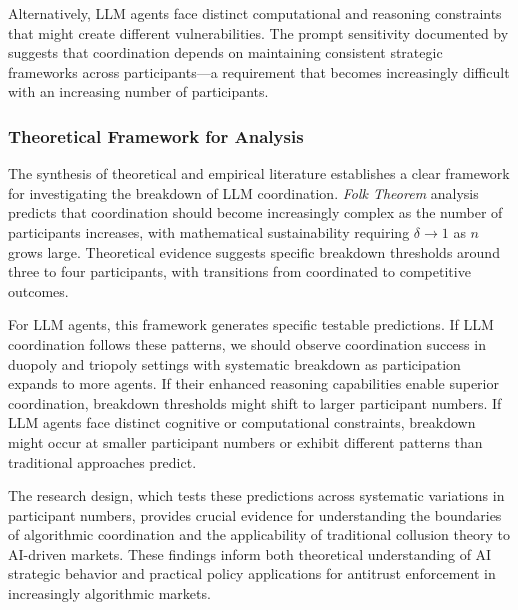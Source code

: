 
Alternatively, LLM agents face distinct computational and reasoning constraints that might create different vulnerabilities. The prompt sensitivity documented by \textcite{fish_algorithmic_2025} suggests that coordination depends on maintaining consistent strategic frameworks across participants---a requirement that becomes increasingly difficult with an increasing number of participants.

\subsubsection*{Theoretical Framework for Analysis}

The synthesis of theoretical and empirical literature establishes a clear framework for investigating the breakdown of LLM coordination. \emph{Folk Theorem} analysis predicts that coordination should become increasingly complex as the number of participants increases, with mathematical sustainability requiring $\delta \rightarrow 1$ as $n$ grows large. Theoretical evidence suggests specific breakdown thresholds around three to four participants, with transitions from coordinated to competitive outcomes.

For LLM agents, this framework generates specific testable predictions. If LLM coordination follows these patterns, we should observe coordination success in duopoly and triopoly settings with systematic breakdown as participation expands to more agents. If their enhanced reasoning capabilities enable superior coordination, breakdown thresholds might shift to larger participant numbers. If LLM agents face distinct cognitive or computational constraints, breakdown might occur at smaller participant numbers or exhibit different patterns than traditional approaches predict.

The research design, which tests these predictions across systematic variations in participant numbers, provides crucial evidence for understanding the boundaries of algorithmic coordination and the applicability of traditional collusion theory to AI-driven markets. These findings inform both theoretical understanding of AI strategic behavior and practical policy applications for antitrust enforcement in increasingly algorithmic markets.